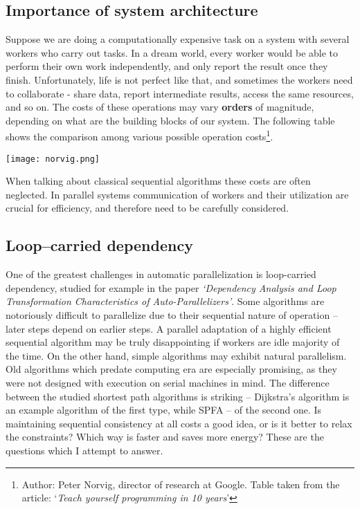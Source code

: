 \documentclass[12pt,a4paper,twoside,openright]{report}
\begin{document}
\subsection{Importance of system architecture} 
Suppose we are doing a computationally expensive task on a system with several workers who carry out tasks. In a dream world, every worker would be able to perform their own work independently, and only report the result once they finish. Unfortunately, life is not perfect like that, and sometimes the workers need to collaborate - share data, report intermediate results, access the same resources, and so on. The costs of these operations may vary \textbf{orders} of magnitude, depending on what are the building blocks of our system. The following table shows the comparison among various possible operation costs\footnote{Author: Peter Norvig, director of research at Google. Table taken from the article: `\textit{Teach yourself programming in 10 years}'}.
\begin{center}
\texttt{[image: norvig.png]}
\end{center}

When talking about classical sequential algorithms these costs are often neglected. In parallel systems communication of workers and their utilization are crucial for efficiency, and therefore need to be carefully considered.

\subsection{Loop--carried dependency}
One of the greatest challenges in automatic parallelization is loop-carried dependency, studied for example in the paper \textit{`Dependency Analysis and Loop Transformation Characteristics of Auto-Parallelizers'}\cite{loop-carried}. Some algorithms are notoriously difficult to parallelize due to their sequential nature of operation -- later steps depend on earlier steps. A parallel adaptation of a highly efficient sequential algorithm may be truly disappointing if workers are idle majority of the time. On the other hand, simple algorithms may exhibit natural parallelism. Old algorithms which predate computing era are especially promising, as they were not designed with execution on serial machines in mind. The difference between the studied shortest path algorithms is striking -- Dijkstra's algorithm is an example algorithm of the first type, while SPFA -- of the second one. Is maintaining sequential consistency at all costs a good idea, or is it better to relax the constraints? Which way is faster and saves more energy? These are the questions which I attempt to answer.
\end{document}
